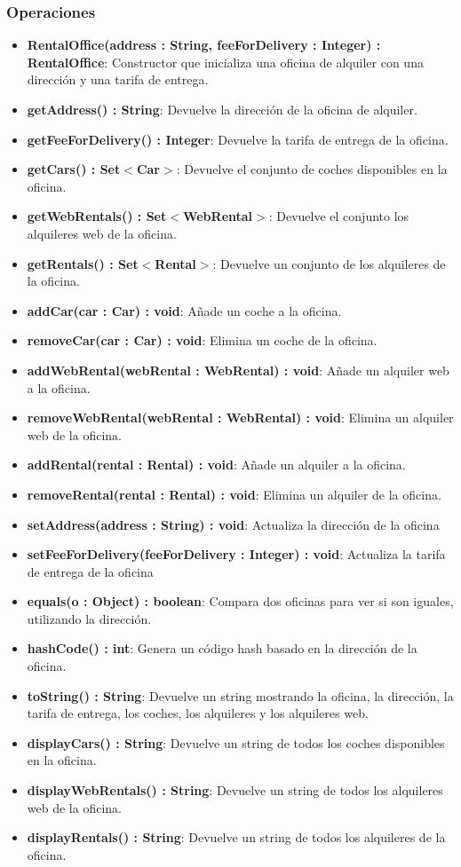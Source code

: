 \subsubsection*{Operaciones}

\begin{itemize}
    \item \textbf{RentalOffice(address : String, feeForDelivery : Integer) : RentalOffice}: 
    Constructor que inicializa una oficina de alquiler con una dirección y una tarifa de entrega.
    \item \textbf{getAddress() : String}: Devuelve la dirección de la oficina de alquiler.
    \item \textbf{getFeeForDelivery() : Integer}: Devuelve la tarifa de entrega de la oficina.
    \item \textbf{getCars() : Set$<$Car$>$}: Devuelve el conjunto de coches disponibles en la oficina.
    \item \textbf{getWebRentals() : Set$<$WebRental$>$}: Devuelve el conjunto los alquileres web de la oficina.
    \item \textbf{getRentals() : Set$<$Rental$>$}: Devuelve un conjunto de los alquileres de la oficina.
    \item \textbf{addCar(car : Car) : void}: Añade un coche a la oficina.
    \item \textbf{removeCar(car : Car) : void}: Elimina un coche de la oficina.
    \item \textbf{addWebRental(webRental : WebRental) : void}: Añade un alquiler web a la oficina.
    \item \textbf{removeWebRental(webRental : WebRental) : void}: Elimina un alquiler web de la oficina.
    \item \textbf{addRental(rental : Rental) : void}: Añade un alquiler a la oficina.
    \item \textbf{removeRental(rental : Rental) : void}: Elimina un alquiler de la oficina.
    \item \textbf{setAddress(address : String) : void}: Actualiza la dirección de la oficina
    \item \textbf{setFeeForDelivery(feeForDelivery : Integer) : void}: Actualiza la tarifa de entrega de la oficina
    \item \textbf{equals(o : Object) : boolean}: Compara dos oficinas para ver si son iguales, utilizando la dirección.
    \item \textbf{hashCode() : int}: Genera un código hash basado en la dirección de la oficina.
    \item \textbf{toString() : String}: Devuelve un string mostrando la oficina, la dirección, la tarifa de entrega, los coches, los alquileres y los alquileres web.
    \item \textbf{displayCars() : String}: Devuelve un string de todos los coches disponibles en la oficina.
    \item \textbf{displayWebRentals() : String}: Devuelve un string de todos los alquileres web de la oficina.
    \item \textbf{displayRentals() : String}: Devuelve un string de todos los alquileres de la oficina.
\end{itemize}

